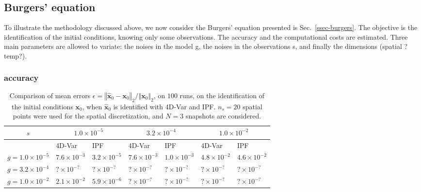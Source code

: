\documentclass[aip,pof,nofootinbib,reprint,onecolumn]{revtex4-1}
\newcommand{\gras}[1]{\boldsymbol{#1}}
\newcommand{\norme}[1]{\left\Vert #1\right\Vert_2}
\newcommand{\Nsnap}{N} %
\newcommand{\Ns}{n_s} %
\newcommand{\point}{\gras{x}} %
\newcommand{\error}{\epsilon} %
\begin{document}
%

\subsection{Burgers' equation}  \label{ssec-results-burgers}
To illustrate the methodology discussed above, we now consider the Burgers' equation presented is Sec.~\ref{ssec-burgers}.
The objective is the identification of the initial conditions, knowing only some observations. 
The accuracy and the computational costs are estimated. 
Three main parameters are allowed to variate: the noises in the model g, the noises in the observations s, and finally the dimensions (spatial ? temp?).

\subsubsection{accuracy}

\begin{table}[h!]
\caption{
Comparison of mean errors $\error = \norme{\hat{\point}_0-\point_0}/\norme{\point_0}$, on $100$ runs, on the identification of the initial conditions $\point_0$, when $\hat{\point}_0$ is identified with 4D-Var and IPF. $\Ns=20$ spatial points were used for the spatial discretization, and $\Nsnap = 3$ snapshots are considered.
}
\begin{centering}
\begin{tabular}{c|ll|ll|ll}
$s$  & \multicolumn{2}{|c}{ $ 1.0\times 10^{-5} $ } & \multicolumn{2}{|c}{ $ 3.2\times 10^{-4} $ } & \multicolumn{2}{|c}{ $ 1.0\times 10^{-2} $ }  \\ 
\hline 
  & {\scriptsize 4D-Var} & {\scriptsize IPF} & {\scriptsize 4D-Var} & {\scriptsize IPF} & {\scriptsize 4D-Var} & {\scriptsize IPF} \\ 
\hline 
$ g=      1.0\times 10^{-5}$ & $7.6\times 10^{-3}$ & $3.2\times 10^{-5}$ & $7.6\times 10^{-3}$ & $1.0\times 10^{-3}$ & $4.8\times 10^{-2}$ & $4.6\times 10^{-2}$ \\ 
$g=      3.2\times 10^{-4} $ & $?\times 10^{-?}$ & $?\times 10^{-?}$ & $?\times 10^{-?}$ & $?\times 10^{-?}$ & $?\times 10^{-?}$ & $?\times 10^{-?}$ \\ 
$ g=      1.0\times 10^{-2}$ & $ 2.1\times 10^{-2}$ & $5.9\times 10^{-6}$ & $?\times 10^{-?}$ & $?\times 10^{-?}$ & $?\times 10^{-?}$ & $?\times 10^{-?}$ \\ 
\end{tabular}
\label{tab-mean_errors_burgers}
\end{centering}
\end{table}
\end{document}
